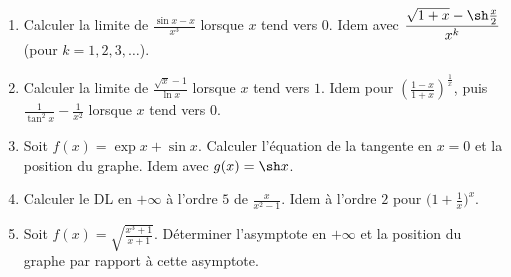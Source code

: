 \documentclass[class=report,crop=false]{standalone}
\begin{document}
\begin{miniexercices}
\sauteligne
\begin{enumerate}
  \item Calculer la limite de $\displaystyle \frac{\sin x - x}{x^3}$ lorsque $x$ tend vers $0$.
Idem avec $\displaystyle \frac{\sqrt{1+x}-\sh \frac x2}{x^k}$ (pour $k=1,2,3,\ldots$).
  \item Calculer la limite de $\displaystyle \frac{\sqrt x - 1}{\ln x}$ lorsque $x$ tend vers $1$.
Idem pour $\displaystyle \left(\frac{1-x}{1+x}\right)^{\frac{1}{x}}$,
puis $\displaystyle \frac{1}{\tan^2 x}-\frac{1}{x^2}$ lorsque $x$ tend vers $0$.
  \item Soit $f(x)=\exp x + \sin x$. Calculer l'équation de la tangente en $x=0$ et la position du graphe.
Idem avec $g(x)= \sh x$.
  \item Calculer le DL en $+\infty$ à l'ordre $5$ de $\frac{x}{x^2-1}$. Idem à l'ordre $2$ pour
$\big(1+\frac 1x\big)^{x}$.
  \item Soit $f(x)=\sqrt{\frac{x^3+1}{x+1}}$. Déterminer l'asymptote en $+\infty$ et la position du graphe
par rapport à cette asymptote.
\end{enumerate}
\end{miniexercices}



\finchapitre
\end{document}
